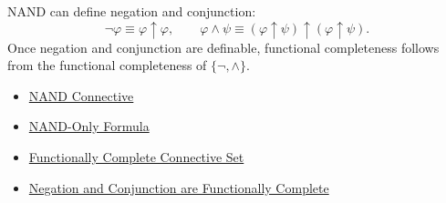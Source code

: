 \begin{remark*}[Interpretation]
NAND can define negation and conjunction:
\[
\neg\varphi\equiv\varphi\uparrow\varphi,
\qquad
\varphi\land\psi\equiv(\varphi\uparrow\psi)\uparrow(\varphi\uparrow\psi).
\]
Once negation and conjunction are definable, functional completeness follows
from the functional completeness of \(\{\neg,\land\}\).
\end{remark*}

\begin{dependencies}
\begin{itemize}
  \item \hyperref[def:nand-connective-propositional-logic]{NAND Connective}
  \item \hyperref[def:nand-only-formula-propositional-logic]{NAND-Only Formula}
  \item \hyperref[def:functionally-complete-connective-set-propositional-logic]{Functionally Complete Connective Set}
  \item \hyperref[thm:negation-conjunction-functionally-complete-propositional-logic]{Negation and Conjunction are Functionally Complete}
\end{itemize}
\end{dependencies}
